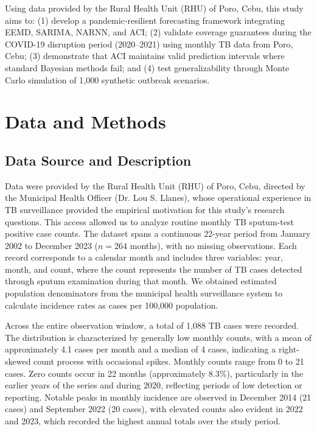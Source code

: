 \documentclass[final,3p,times,twocolumn,authoryear]{elsarticle}
\begin{document}
Using data provided by the Rural Health Unit (RHU) of Poro, Cebu, this study aims to: (1) develop a pandemic-resilient forecasting framework integrating EEMD, SARIMA, NARNN, and ACI; (2) validate coverage guarantees during the COVID-19 disruption period (2020--2021) using monthly TB data from Poro, Cebu; (3) demonstrate that ACI maintains valid prediction intervals where standard Bayesian methods fail; and (4) test generalizability through Monte Carlo simulation of 1,000 synthetic outbreak scenarios.

\section{Data and Methods}
\label{sec:data_methods}

\subsection{Data Source and Description}
Data were provided by the Rural Health Unit (RHU) of Poro, Cebu, directed by the Municipal Health Officer (Dr. Lou S. Llanes), whose operational experience in TB surveillance provided the empirical motivation for this study's research questions. This access allowed us to analyze routine monthly TB sputum-test positive case counts. The dataset spans a continuous 22-year period from January 2002 to December 2023 ($n = 264$ months), with no missing observations. Each record corresponds to a calendar month and includes three variables: year, month, and count, where the count represents the number of TB cases detected through sputum examination during that month. We obtained estimated population denominators from the municipal health surveillance system to calculate incidence rates as cases per 100,000 population.

Across the entire observation window, a total of 1,088 TB cases were recorded. The distribution is characterized by generally low monthly counts, with a mean of approximately 4.1 cases per month and a median of 4 cases, indicating a right-skewed count process with occasional spikes. Monthly counts range from 0 to 21 cases. Zero counts occur in 22 months (approximately 8.3\%), particularly in the earlier years of the series and during 2020, reflecting periods of low detection or reporting. Notable peaks in monthly incidence are observed in December 2014 (21 cases) and September 2022 (20 cases), with elevated counts also evident in 2022 and 2023, which recorded the highest annual totals over the study period.
\end{document}
